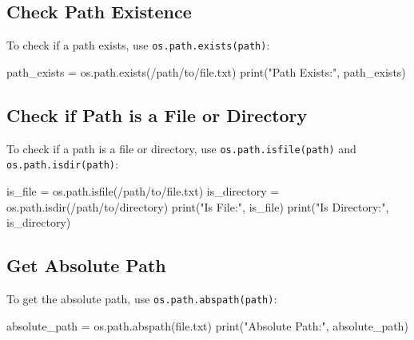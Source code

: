 \documentclass[
  letterpaper,
  DIV=11,
  numbers=noendperiod]{scrreprt}
\newenvironment{Shaded}{\begin{snugshade}}{\end{snugshade}}
\newcommand{\BuiltInTok}[1]{\textcolor[rgb]{0.00,0.23,0.31}{#1}}
\newcommand{\NormalTok}[1]{\textcolor[rgb]{0.00,0.23,0.31}{#1}}
\newcommand{\OperatorTok}[1]{\textcolor[rgb]{0.37,0.37,0.37}{#1}}
\newcommand{\StringTok}[1]{\textcolor[rgb]{0.13,0.47,0.30}{#1}}
\begin{document}
\subsection{Check Path Existence}\label{check-path-existence}

To check if a path exists, use \texttt{os.path.exists(path)}:

\begin{Shaded}
\begin{Highlighting}[]
\NormalTok{path\_exists }\OperatorTok{=}\NormalTok{ os.path.exists(}\StringTok{\textquotesingle{}/path/to/file.txt\textquotesingle{}}\NormalTok{)}
\BuiltInTok{print}\NormalTok{(}\StringTok{"Path Exists:"}\NormalTok{, path\_exists)}
\end{Highlighting}
\end{Shaded}

\subsection{Check if Path is a File or
Directory}\label{check-if-path-is-a-file-or-directory}

To check if a path is a file or directory, use
\texttt{os.path.isfile(path)} and \texttt{os.path.isdir(path)}:

\begin{Shaded}
\begin{Highlighting}[]
\NormalTok{is\_file }\OperatorTok{=}\NormalTok{ os.path.isfile(}\StringTok{\textquotesingle{}/path/to/file.txt\textquotesingle{}}\NormalTok{)}
\NormalTok{is\_directory }\OperatorTok{=}\NormalTok{ os.path.isdir(}\StringTok{\textquotesingle{}/path/to/directory\textquotesingle{}}\NormalTok{)}
\BuiltInTok{print}\NormalTok{(}\StringTok{"Is File:"}\NormalTok{, is\_file)}
\BuiltInTok{print}\NormalTok{(}\StringTok{"Is Directory:"}\NormalTok{, is\_directory)}
\end{Highlighting}
\end{Shaded}

\subsection{Get Absolute Path}\label{get-absolute-path}

To get the absolute path, use \texttt{os.path.abspath(path)}:

\begin{Shaded}
\begin{Highlighting}[]
\NormalTok{absolute\_path }\OperatorTok{=}\NormalTok{ os.path.abspath(}\StringTok{\textquotesingle{}file.txt\textquotesingle{}}\NormalTok{)}
\BuiltInTok{print}\NormalTok{(}\StringTok{"Absolute Path:"}\NormalTok{, absolute\_path)}
\end{Highlighting}
\end{Shaded}
\end{document}
